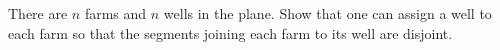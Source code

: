 There are $n$ farms and $n$ wells in the plane. Show that one can assign a well to each farm so that the segments joining each farm to its well are disjoint.
